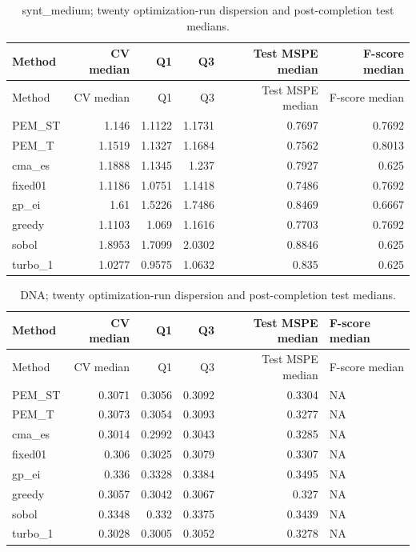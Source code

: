 \documentclass[11pt,a4paper]{article}
\begin{document}
\par\noindent\begin{minipage}{\linewidth}

\begin{longtable}[]{@{}lrrrrr@{}}
\caption{synt\_medium; twenty optimization-run dispersion and
post-completion test medians.}\tabularnewline
\toprule
Method & CV median & Q1 & Q3 & Test MSPE median & F-score median \\
\midrule
\endfirsthead
\toprule
Method & CV median & Q1 & Q3 & Test MSPE median & F-score median \\
\midrule
\endhead
PEM\_ST & 1.146 & 1.1122 & 1.1731 & 0.7697 & 0.7692 \\
PEM\_T & 1.1519 & 1.1327 & 1.1684 & 0.7562 & 0.8013 \\
cma\_es & 1.1888 & 1.1345 & 1.237 & 0.7927 & 0.625 \\
fixed01 & 1.1186 & 1.0751 & 1.1418 & 0.7486 & 0.7692 \\
gp\_ei & 1.61 & 1.5226 & 1.7486 & 0.8469 & 0.6667 \\
greedy & 1.1103 & 1.069 & 1.1616 & 0.7703 & 0.7692 \\
sobol & 1.8953 & 1.7099 & 2.0302 & 0.8846 & 0.625 \\
turbo\_1 & 1.0277 & 0.9575 & 1.0632 & 0.835 & 0.625 \\
\bottomrule
\end{longtable}

\end{minipage}\par

\par\noindent\begin{minipage}{\linewidth}

\begin{longtable}[]{@{}lrrrrl@{}}
\caption{DNA; twenty optimization-run dispersion and post-completion
test medians.}\tabularnewline
\toprule
Method & CV median & Q1 & Q3 & Test MSPE median & F-score median \\
\midrule
\endfirsthead
\toprule
Method & CV median & Q1 & Q3 & Test MSPE median & F-score median \\
\midrule
\endhead
PEM\_ST & 0.3071 & 0.3056 & 0.3092 & 0.3304 & NA \\
PEM\_T & 0.3073 & 0.3054 & 0.3093 & 0.3277 & NA \\
cma\_es & 0.3014 & 0.2992 & 0.3043 & 0.3285 & NA \\
fixed01 & 0.306 & 0.3025 & 0.3079 & 0.3307 & NA \\
gp\_ei & 0.336 & 0.3328 & 0.3384 & 0.3495 & NA \\
greedy & 0.3057 & 0.3042 & 0.3067 & 0.327 & NA \\
sobol & 0.3348 & 0.332 & 0.3375 & 0.3439 & NA \\
turbo\_1 & 0.3028 & 0.3005 & 0.3052 & 0.3278 & NA \\
\bottomrule
\end{longtable}

\end{minipage}\par
\end{document}
